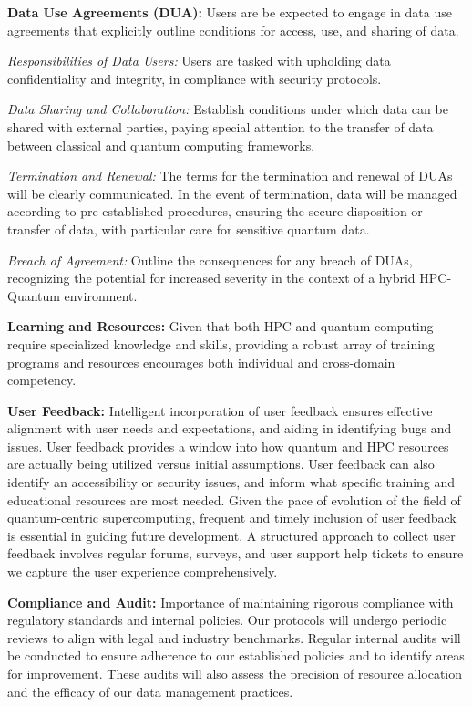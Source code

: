 \textbf{Data Use Agreements (DUA):} Users are be expected to engage in data use agreements that explicitly outline conditions for access, use, and sharing of data.



\textit{Responsibilities of Data Users:} Users are tasked with upholding data confidentiality and integrity, in compliance with security protocols.

\textit{Data Sharing and Collaboration:} Establish conditions under which data can be shared with external parties, paying special attention to the transfer of data between classical and quantum computing frameworks.

\textit{Termination and Renewal:} The terms for the termination and renewal of DUAs will be clearly communicated. In the event of termination, data will be managed according to pre-established procedures, ensuring the secure disposition or transfer of data, with particular care for sensitive quantum data.

\textit{Breach of Agreement:} Outline the consequences for any breach of DUAs, recognizing the potential for increased severity in the context of a hybrid HPC-Quantum environment.

\textbf{Learning and Resources:} Given that both HPC and quantum computing require specialized knowledge and skills, providing a robust array of training programs and resources encourages both individual and cross-domain competency.



\textbf{User Feedback:} Intelligent incorporation of user feedback ensures effective alignment with user needs and expectations, and aiding in identifying bugs and issues. User feedback provides a window into how quantum and HPC resources are actually being utilized versus initial assumptions. User feedback can also identify an accessibility or security issues, and inform what specific training and educational resources are most needed. Given the pace of evolution of the field of quantum-centric supercomputing, frequent and timely inclusion of user feedback is essential in guiding future development.  A structured approach to collect user feedback involves regular forums, surveys, and user support help tickets to ensure we capture the user experience comprehensively.


\textbf{Compliance and Audit:} Importance of maintaining rigorous compliance with regulatory standards and internal policies. Our protocols will undergo periodic reviews to align with legal and industry benchmarks. Regular internal audits will be conducted to ensure adherence to our established policies and to identify areas for improvement. These audits will also assess the precision of resource allocation and the efficacy of our data management practices.

